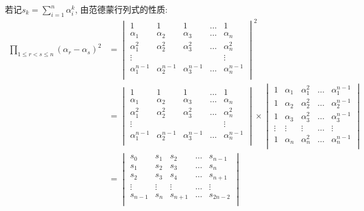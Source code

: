\documentclass[a4paper,12pt]{ctexart}
\begin{document}
若记$s_k=\sum_{i=1}^n\alpha_i^k$,
由范德蒙行列式的性质:
\begin{align*}
    \prod_{1\le r<s\le n}(\alpha_r-\alpha_s)^2 & =\begin{vmatrix}
        1              & 1              & 1              & \dots & 1              \\
        \alpha_1       & \alpha_2       & \alpha_3       & \dots & \alpha_n       \\
        \alpha_1^{2}   & \alpha_2^{2}   & \alpha_3^{2}   & \dots & \alpha_n^{2}   \\
        \vdots         &                &                &       & \vdots         \\
        \alpha_1^{n-1} & \alpha_2^{n-1} & \alpha_3^{n-1} & \dots & \alpha_n^{n-1} \\
    \end{vmatrix}^2                                \\
                                               & =\begin{vmatrix}
        1              & 1              & 1              & \dots & 1              \\
        \alpha_1       & \alpha_2       & \alpha_3       & \dots & \alpha_n       \\
        \alpha_1^{2}   & \alpha_2^{2}   & \alpha_3^{2}   & \dots & \alpha_n^{2}   \\
        \vdots         &                &                &       & \vdots         \\
        \alpha_1^{n-1} & \alpha_2^{n-1} & \alpha_3^{n-1} & \dots & \alpha_n^{n-1} \\
    \end{vmatrix}\times \begin{vmatrix}
        1      & \alpha_1 & \alpha_1^2   & \dots & \alpha_1^{n-1} \\
        1      & \alpha_2 & \alpha_2^2   & \dots & \alpha_2^{n-1} \\
        1      & \alpha_3 & \alpha_3^{2} & \dots & \alpha_3^{n-1} \\
        \vdots & \vdots   & \vdots       & \dots & \vdots         \\
        1      & \alpha_n & \alpha_n^{2} & \dots & \alpha_n^{n-1} \\
    \end{vmatrix} \\ & =\begin{vmatrix}
        s_0     & s_1    & s_2     & \dots & s_{n-1}  \\
        s_1     & s_2    & s_3     & \dots & s_{n}    \\
        s_2     & s_3    & s_4     & \dots & s_{n+1}  \\
        \vdots  & \vdots & \vdots  & \dots & \vdots   \\
        s_{n-1} & s_n    & s_{n+1} & \dots & s_{2n-2} \\
    \end{vmatrix}
\end{align*}
\end{document}
